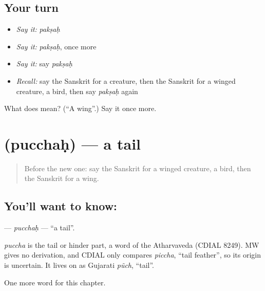\subsection*{Your turn}
\begin{itemize}
\raggedright
  \item \emph{Say it:} \emph{pakṣaḥ}
  \item \emph{Say it:} \emph{pakṣaḥ}, once more
  \item \emph{Say it:} say \emph{pakṣaḥ}
  \item \emph{Recall:} say the Sanskrit for a creature, then the Sanskrit for a winged creature, a bird, then say \emph{pakṣaḥ} again
\end{itemize}

\begin{tcolorbox}[breakable,colback=teal!4,colframe=teal!35!black,title={Before you move on}]
What does  mean? (\textquotedblleft{}A wing\textquotedblright{}.) Say it once more.
\end{tcolorbox}
\section[\texorpdfstring{\sk{पुच्छः} (pucchaḥ)}{पुच्छः (pucchaḥ)}]{ (pucchaḥ) — a tail}

\label{lesson:SA-C227-pucchah}



\begin{quote}
Before the new one: say the Sanskrit for a winged creature, a bird, then the Sanskrit for a wing.
\end{quote}

\subsection*{You'll want to know: }
\textbf{} — \emph{pucchaḥ} — \textquotedblleft{}a tail\textquotedblright{}.

\begin{cousinweb}
\emph{puccha} is the tail or hinder part, a word of the Atharvaveda (CDIAL 8249). MW gives no derivation, and CDIAL only compares \emph{piccha}, \textquotedblleft{}tail feather\textquotedblright{}, so its origin is uncertain. It lives on as Gujarati \emph{pũch}, \textquotedblleft{}tail\textquotedblright{}.
\end{cousinweb}

\begin{grammarlens}[title={What you've built}]
One more word for this chapter.
\end{grammarlens}

